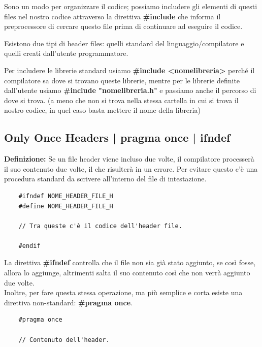 \textsf{\small Sono un modo per organizzare il codice; possiamo includere gli elementi di questi files nel nostro codice attraverso la direttiva \textbf{\#include} che informa il preprocessore di cercare questo file prima di continuare ad eseguire il codice. } 

\textsf{\small Esistono due tipi di header files: quelli standard del linguaggio/compilatore e quelli creati dall'utente programmatore.}

\textsf{\small Per includere le librerie standard usiamo \textbf{\#include <nomelibreria>} perché il compilatore sa dove si trovano queste librerie, mentre per le librerie definite dall'utente usiamo \textbf{\#include "nomelibreria.h"} e passiamo anche il percorso di dove si trova. (a meno che non si trova nella stessa cartella in cui si trova il nostro codice, in quel caso basta mettere il nome della libreria)} \\

\subsection{Only Once Headers | pragma once | ifndef}

\textsf{\small \textbf{Definizione: } Se un file header viene incluso due volte, il compilatore processerà il suo contenuto due volte, il che risulterà in un errore. Per evitare questo c'è una procedura standard da scrivere all'interno del file di intestazione.}

\begin{lstlisting}
	#ifndef NOME_HEADER_FILE_H
	#define NOME_HEADER_FILE_H
	
	// Tra queste c'è il codice dell'header file.
	
	#endif
\end{lstlisting}

\textsf{\small La direttiva \textbf{\#ifndef} controlla che il file non sia già stato aggiunto, se così fosse, allora lo aggiunge, altrimenti salta il suo contenuto così che non verrà aggiunto due volte.} \\

\textsf{\small Inoltre, per fare questa stessa operazione, ma più semplice e corta esiste una direttiva non-standard: \textbf{\#pragma once}. } 

\begin{lstlisting}
	#pragma once
	
	// Contenuto dell'header.
\end{lstlisting}

